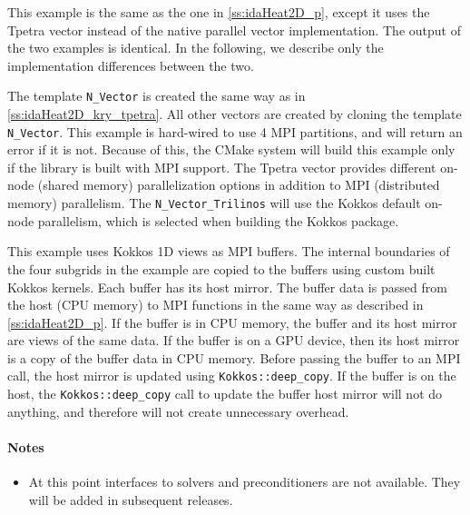 This example is the same as the one in \ref{ss:idaHeat2D_p}, except 
it uses the Tpetra vector instead of the native {\sundials} parallel vector 
implementation. The output of the two examples is identical. In the following, 
we describe only the implementation differences between the two. 

The template \verb|N_Vector| is created the same way as in
\ref{ss:idaHeat2D_kry_tpetra}. All other vectors are created by
cloning the template \verb|N_Vector|. This example is hard-wired to use
4 MPI partitions, and will return an error if it is not.
Because of this, the {\sundials} CMake system will build this example only
if the {\trilinos} library is built with MPI support.
The Tpetra vector provides different on-node (shared memory)
parallelization options in addition to MPI (distributed memory) parallelism.
The \verb|N_Vector_Trilinos| will use the Kokkos default on-node
parallelism, which is selected when building the Kokkos package. 

This example uses Kokkos 1D views \cite{edwards2014kokkos} as MPI buffers. The internal
boundaries of the four subgrids in the example are copied to the buffers using custom built
Kokkos kernels. Each buffer has its host mirror. The buffer data is passed from
the host (CPU memory) to MPI functions in the same way as described in \ref{ss:idaHeat2D_p}. 
If the buffer is in CPU memory,
the buffer and its host mirror are views of the same data. If the buffer is on
a GPU device, then its host mirror is a copy of the buffer data in CPU memory.
Before passing the buffer to an MPI call, the host mirror is updated using
\verb|Kokkos::deep_copy|. If the buffer is
on the host, the \verb|Kokkos::deep_copy| call to update the buffer host mirror will
not do anything, and therefore will not create unnecessary overhead.

\paragraph{\bf Notes} 
           
\begin{itemize}
                                        
\item
  {\warn}At this point interfaces to {\trilinos} solvers and preconditioners are 
  not available. They will be added in subsequent {\sundials} releases. 

\end{itemize}




